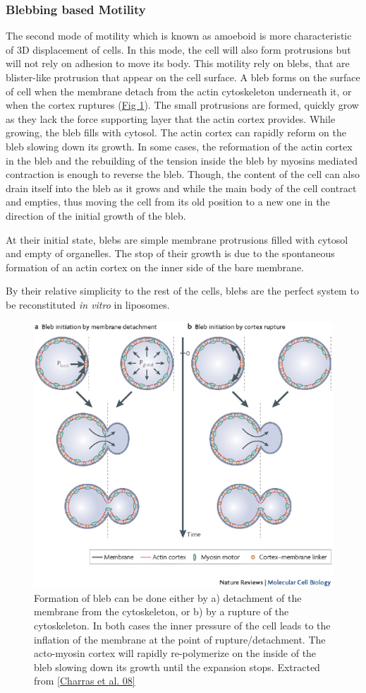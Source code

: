 \documentclass[A4paperpaper,11pt,english]{sphinxmanual}
\begin{document}
\subsubsection{Blebbing based Motility}
\label{index-latex:blebbing-based-motility}
The second mode of motility which is known as amoeboid is more characteristic
of 3D displacement of cells. In this mode, the cell will also form protrusions
but will not rely on adhesion to move its body. This motility rely on blebs,
that are blister-like protrusion that appear on the cell surface. A bleb
forms on the surface of cell when the membrane detach from the actin
cytoskeleton underneath it, or when the cortex ruptures (\hyperref[index-latex:fig-bleb]{Fig  \ref*{index-latex:fig-bleb}}). The small protrusions
are formed, quickly grow as they lack the force supporting layer that the actin
cortex provides. While growing, the bleb fills with cytosol. The actin
cortex can rapidly reform on the bleb slowing down its growth. In some cases,
the reformation of the actin cortex in the bleb and the rebuilding of the
tension inside the bleb by myosins mediated contraction is enough to reverse
the bleb. Though, the content of the cell can also drain itself into the bleb
as it grows and while the main body of the cell contract and empties, thus
moving the cell from its old position to a new one in the direction of the
initial growth of the bleb.

At their initial state, blebs are simple membrane protrusions filled with
cytosol and empty of organelles. The stop of their growth is due to the
spontaneous formation of an actin cortex on the inner side of the bare
membrane.

By their relative simplicity to the rest of the cells, blebs are the perfect
system to be reconstituted \emph{in vitro} in liposomes.
\begin{figure}[htbp]
\centering
\capstart

\includegraphics[width=0.400\linewidth]{Bleb-nature-paluch.jpg}
\caption{Formation of bleb can be done either by a) detachment of the membrane from
the cytoskeleton, or b) by a rupture of the cytoskeleton. In both cases the
inner pressure of the cell leads to the inflation of the membrane at the
point of rupture/detachment. The acto-myosin cortex will rapidly re-polymerize on
the inside of the bleb slowing down its growth until the expansion stops.
Extracted from {\hyperref[index-latex:charras2008]{{[}Charras et al. 08{]}}}}\label{index-latex:fig-bleb}\end{figure}
\end{document}
